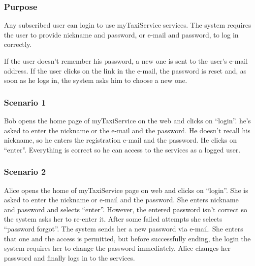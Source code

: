 \label{user-login}
\subsubsection{Purpose}
Any subscribed user can login to use myTaxiService services.
The system requires the user to provide nickname and password, or e-mail and password, to log in correctly.

If the user doesn't remember his password, a new one is sent to the user's e-mail address. If the user clicks on the link in the e-mail, the password is reset and, as soon as he logs in, the system asks him to choose a new one. 



\subsubsection{Scenario 1}
Bob opens the home page of myTaxiService on the web and clicks on ``login''. 
he's asked to enter the nickname or the e-mail and the password. He doesn't recall his nickname, so he enters the registration e-mail and the password. He clicks on ``enter''. 
Everything is correct so he can access to the services as a logged user.

\subsubsection{Scenario 2}
Alice opens the home of myTaxiService page on web and clicks on ``login''.  
She is asked to enter the nickname or e-mail and the password.
She enters nickname and password and selects ``enter''. However, the entered password isn't correct so the system asks her to re-enter it. 
After some failed attempts she selects ``password forgot''.
The system sends her a new password via e-mail. She enters that one and the access is permitted, but before successfully ending, the login the system requires her to change the password immediately. 
Alice changes her password and finally logs in to the services.

